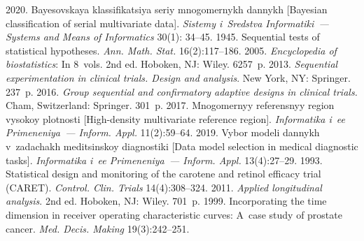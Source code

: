 
 





 \begin{multicols}{2}

\renewcommand{\bibname}{\protect\rmfamily References}

{\small\frenchspacing
 {%
 \begin{thebibliography}{99}

 2020. Bayesovskaya klassifikatsiya seriy mnogomernykh 
dannykh [Bayesian classification of serial multivariate data]. \textit{Sistemy 
i~Sredstva Informatiki~--- Systems and Means of Informatics} 30(1): 34--45.
 1945. Sequential tests of statistical hypotheses. \textit{Ann. 
Math. Stat.} 16(2):117--186.
 2005. 
\textit{Encyclopedia of biostatistics}: In 8~vols. 
2nd ed. Hoboken, NJ: Wiley. 6257~p.
 2013. \textit{Sequential 
experimentation in clinical trials. Design and analysis}. New York, NY: Springer. 
237~p.
 2016. \textit{Group sequential and 
confirmatory adaptive designs in clinical trials.} Cham, Switzerland: Springer. 
301~p.
 2017. Mnogomernyy referensnyy region vysokoy plotnosti 
[High-density multivariate reference region]. \textit{Informatika i~ee 
Primeneniya~--- Inform. Appl.} 11(2):59--64.
 2019. Vybor modeli dannykh v~zadachakh meditsinskoy 
diagnostiki [Data model selection in medical diagnostic tasks]. \textit{Informatika 
i~ee Primeneniya~--- Inform. Appl.}  
13(4):27--29.
 1993. Statistical design and monitoring of 
the carotene and retinol efficacy trial (CARET). \textit{Control. Clin. Trials} 
14(4):308--324.
 2011. \textit{Applied 
longitudinal analysis}. 2nd ed. Hoboken, NJ: Wiley. 701~p.
 1999. 
Incorporating the time dimension in receiver operating characteristic curves: A~case 
study of prostate cancer. \textit{Med. Decis. Making} 19(3):242--251.


\end{thebibliography}

 }
 }

\end{multicols}

